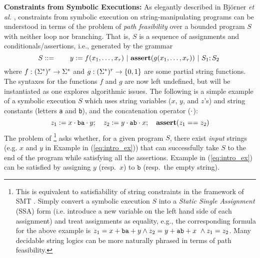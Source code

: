 \smallskip
\noindent
\textbf{Constraints from Symbolic Executions: }
As elegantly described in Bj\"{o}rner \emph{et al.} \cite{BTV09}, constraints 
from symbolic 
execution on string-manipulating programs can be understood in terms of the
problem of \emph{path 
feasibility} over a bounded program $S$ with neither loop nor
branching. %
That is, $S$ is a sequence of assignments and conditionals/assertions, i.e., 
generated by the grammar
\begin{equation}
    S ::= \qquad y := f(x_1,\ldots,x_\arity) \ |\
    \text{\ASSERT{$g(x_1,\ldots,x_\arity)$}}\ |\ 
            S_1; S_2\ 
            \label{eq:symbex}
\end{equation}
where $f: (\Sigma^*)^r \to \Sigma^*$ and $g: (\Sigma^*)^r \to \{0,1\}$ are
some partial string functions. 
The syntaxes for the functions $f$ and $g$ are now
left undefined, but will be instantiated as one explores algorithmic issues.
The following is a simple example of a symbolic execution $S$
which uses string variables ($x$, $y$, and $z$'s) and string constants
(letters \texttt{a} and \texttt{b}), and the concatenation operator ($\cdot$):
\begin{equation}
        z_1 := x \cdot \text{\texttt{ba}} \cdot y;\quad 
        z_2 := y \cdot \text{\texttt{ab}} \cdot x;\quad
        \textbf{assert}(z_1 == z_2)
        \label{eq:intro_ex}
\end{equation}
The problem of \footnote{
    This is equivalent to 
satisfiability of string constraints in the framework of SMT
\cite{SMT-CACM,SMT-chapter,KS08}.
Simply convert a symbolic execution $S$ 
into a \emph{Static Single Assignment} (SSA) form (i.e. introduce a new 
variable 
on the left hand side of each assignment) and treat assignments as equality,
e.g., the corresponding formula for the above example is
        $z_1 = x + \text{\texttt{ba}} + y \wedge
        z_2 = y + \text{\texttt{ab}} + x\ \wedge
        z_1 = z_2$.
Many decidable string logics can be more naturally phrased in terms of
path feasibility.}
asks whether, for a given program $S$, there exist \emph{input} strings (e.g.
$x$ and $y$ in Example in (\ref{eq:intro_ex}))
that can successfully take
$S$ to the end of the program while satisfying all the assertions. 
Example in (\ref{eq:intro_ex}) can be satisfied by
assigning $y$ (resp.~$x$) to $\texttt{b}$ (resp.~the empty string). 


